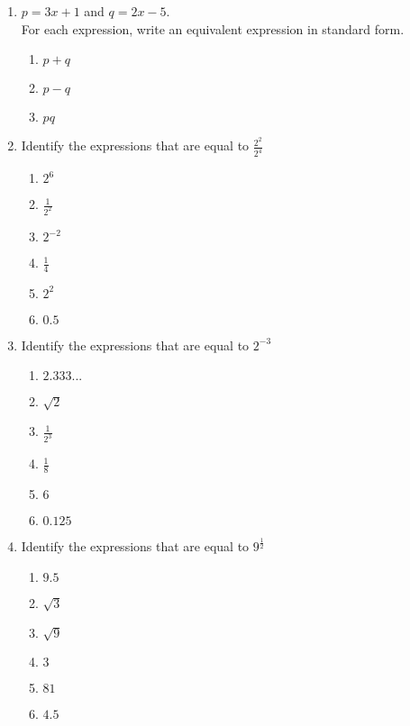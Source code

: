 \documentclass[12pt, twoside]{article}
\begin{document}
\begin{enumerate}
\item $p = 3x +1$ and $q = 2x-5$. \\[0.5cm]
For each expression, write an equivalent expression in standard form.
    \begin{enumerate}[itemsep=0.5cm]
        \item $p+q$
        \item $p-q$
        \item $pq$
    \end{enumerate}


\newpage
\item Identify the expressions that are equal to $\displaystyle \frac{2^2}{2^4}$
    \begin{multicols}{2}
    \begin{enumerate}
        \item $2^6$
        \item $\displaystyle \frac{1}{2^2}$
        \item $2^{-2}$
        \item $\frac{1}{4}$
        \item $2^{2}$
        \item $0.5$
    \end{enumerate}
    \end{multicols}

\item Identify the expressions that are equal to $\displaystyle 2^{-3}$
    \begin{multicols}{2}
    \begin{enumerate}
        \item $2.333...$
        \item $\sqrt{2}$
        \item $\displaystyle \frac{1}{2^3}$
        \item $\displaystyle \frac{1}{8}$
        \item $6$
        \item $0.125$
    \end{enumerate}
    \end{multicols}

\item Identify the expressions that are equal to $\displaystyle 9^{\frac{1}{2}}$
    \begin{multicols}{2}
    \begin{enumerate}
        \item $9.5$
        \item $\sqrt{3}$
        \item $\sqrt{9}$
        \item $3$
        \item $81$
        \item $4.5$
    \end{enumerate}
    \end{multicols}


\end{enumerate}
\end{document}
